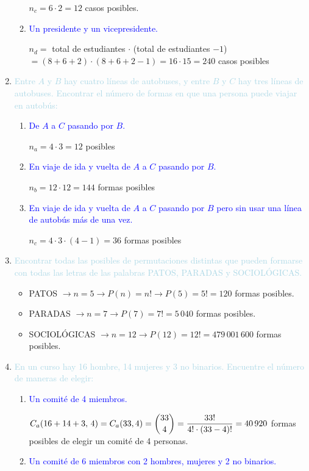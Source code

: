 \documentclass[12pt]{article}
\newcommand{\lb}[1]{\textcolor{lightblue}{#1}}
\newcommand{\db}[1]{\textcolor{blue}{#1}}
\begin{document}
\begin{enumerate}[label=\color{red}\textbf{\arabic*)}, leftmargin=*]
\begin{enumerate}[label=\color{red}\alph*)]
        $n_c=6\cdot2=12$ casos posibles.
        \item \db{Un presidente y un vicepresidente.}
        
        $n_d=$ total de estudiantes $\cdot$ (total de estudiantes $- 1$) $=(8+6+2)\cdot(8+6+2-1)=16\cdot15=240$ casos posibles
    \end{enumerate}
    \item \lb{Entre $A$ y $B$ hay cuatro líneas de autobuses, y entre $B$ y $C$ hay tres líneas de autobuses. Encontrar el número de formas en que una persona puede viajar en autobús:}
    \begin{enumerate}[label=\color{red}\alph*)]
        \item \db{De $A$ a $C$ pasando por $B$.}
        
        $n_a=4\cdot3=12$ posibles
        \item \db{En viaje de ida y vuelta de $A$ a $C$ pasando por $B$.}
        
        $n_b=12\cdot12=144$ formas posibles
        \item \db{En viaje de ida y vuelta de $A$ a $C$ pasando por $B$ pero sin usar una línea de autobús más de una vez.}
        
        $n_c=4\cdot 3\cdot(4-1)=36$ formas posibles
    \end{enumerate}
    \item \lb{Encontrar todas las posibles de permutaciones distintas que pueden formarse con todas las letras de las palabras PATOS, PARADAS y SOCIOLÓGICAS.}
    \begin{itemize}[label=$-$]
    \item PATOS $\longrightarrow n=5\longrightarrow P(n)=n!\longrightarrow P(5)=5!=120$ formas posibles.
    \item PARADAS $\longrightarrow n=7\longrightarrow P(7)=7!=5\,040$ formas posibles.
    \item SOCIOLÓGICAS $\longrightarrow n=12\longrightarrow P(12)=12!=479\,001\,600$ formas posibles.
    \end{itemize}
    
    \item \lb{En un curso hay 16 hombre, 14 mujeres y 3 no binarios. Encuentre el número de maneras de elegir:}
    \begin{enumerate}[label=\color{red}\alph*)]
    	\item \db{Un comité de 4 miembros.}
        
        $C_a(16+14+3,\,4)=C_a(33,4)=\dbinom{33}{4}=\dfrac{33!}{4!\cdot(33-4)!}=40\,920$ formas posibles de elegir un comité de 4 personas.
        \item \db{Un comité de 6 miembros con 2 hombres, mujeres y 2 no binarios.}
        

\end{enumerate}
\end{enumerate}
\end{document}
